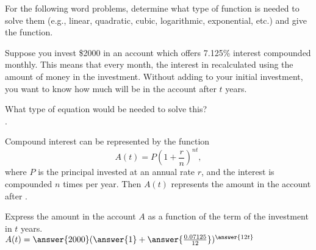 \documentclass{ximera}
\author{Elizabeth Campolongo}
\begin{document}
\begin{exercise}
For the following word problems, determine what type of function is needed to solve them (e.g., linear, quadratic, cubic, logarithmic, exponential, etc.) and give the function. 
%

Suppose you invest \$2000 in an account which offers 7.125\% interest compounded monthly. This means that every month, the interest in recalculated using the amount of money in the investment. Without adding to your initial investment, you want to know how much will be in the account after $t$ years. 

What type of equation would be needed to solve this?\\
.
\begin{exercise}
Compound interest can be represented by the function
$$A(t) = P\left(1+\frac{r}{n}\right)^{nt},$$
where $P$ is the principal invested at an annual rate $r$, and the interest is compounded $n$ times per year. Then $A(t)$ represents the amount in the account after
%
.

\begin{exercise}
Express the amount in the account $A$ as a function of the term of the investment in $t$ years.\\
$A(t) = \answer{2000}(\answer{1}+ \answer{\frac{0.07125}{12}})^{\answer{12t}}$
\end{exercise}
\end{exercise}



\end{exercise}
\end{document}
